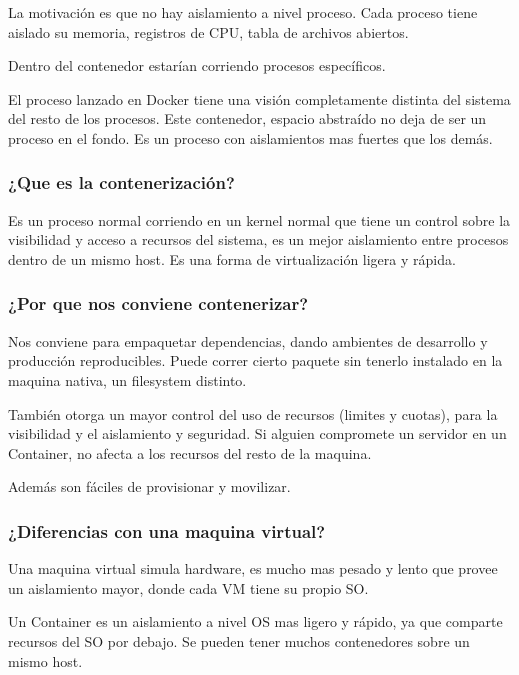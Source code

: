\documentclass[titlepage,a4paper]{article}
\begin{document}
\medskip
La motivación es que no hay aislamiento a nivel proceso. Cada proceso tiene aislado su memoria, registros de CPU, tabla de archivos abiertos.

\medskip
Dentro del contenedor estarían corriendo procesos específicos.

\medskip
El proceso lanzado en Docker tiene una visión completamente distinta del sistema del resto de los procesos. Este contenedor, espacio abstraído no deja de ser un proceso en el fondo. Es un proceso con aislamientos mas fuertes que los demás.


\subsubsection*{¿Que es la contenerización?}
Es un proceso normal corriendo en un kernel normal que tiene un control sobre la visibilidad y acceso a recursos del sistema, es un mejor aislamiento entre procesos dentro de un mismo host. Es una forma de virtualización ligera y rápida.

\medskip
\subsubsection*{¿Por que nos conviene contenerizar?}
Nos conviene para empaquetar dependencias, dando ambientes de desarrollo y producción reproducibles. Puede correr cierto paquete sin tenerlo instalado en la maquina nativa, un filesystem distinto.

\medskip
También otorga un mayor control del uso de recursos (limites y cuotas), para la visibilidad y el aislamiento y seguridad. Si alguien compromete un servidor en un Container, no afecta a los recursos del resto de la maquina.

\medskip
Además son fáciles de provisionar y movilizar.

\subsubsection*{¿Diferencias con una maquina virtual?}

Una maquina virtual simula hardware, es mucho mas pesado y lento que provee un aislamiento mayor, donde cada VM tiene su propio SO.

\medskip
Un Container es un aislamiento a nivel OS mas ligero y rápido, ya que comparte recursos del SO por debajo. Se pueden tener muchos contenedores sobre un mismo host.

\end{document}
